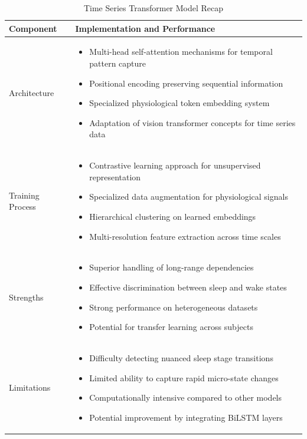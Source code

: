 \documentclass[a4paper,12pt,twoside]{article}
\begin{document}
\begin{table}[H]
\centering
\caption{Time Series Transformer Model Recap}
\begin{tabular}{|p{3cm}|p{11cm}|}
\hline
\textbf{Component} & \textbf{Implementation and Performance} \\
\hline
Architecture & 
\begin{itemize}
  \item Multi-head self-attention mechanisms for temporal pattern capture
  \item Positional encoding preserving sequential information
  \item Specialized physiological token embedding system
  \item Adaptation of vision transformer concepts for time series data
\end{itemize} \\
\hline
Training Process & 
\begin{itemize}
  \item Contrastive learning approach for unsupervised representation
  \item Specialized data augmentation for physiological signals
  \item Hierarchical clustering on learned embeddings
  \item Multi-resolution feature extraction across time scales
\end{itemize} \\
\hline
Strengths & 
\begin{itemize}
  \item Superior handling of long-range dependencies
  \item Effective discrimination between sleep and wake states
  \item Strong performance on heterogeneous datasets
  \item Potential for transfer learning across subjects
\end{itemize} \\
\hline
Limitations & 
\begin{itemize}
  \item Difficulty detecting nuanced sleep stage transitions
  \item Limited ability to capture rapid micro-state changes
  \item Computationally intensive compared to other models
  \item Potential improvement by integrating BiLSTM layers
\end{itemize} \\
\hline
\end{tabular}
\label{tab:transformer_summary}
\end{table}
\end{document}
